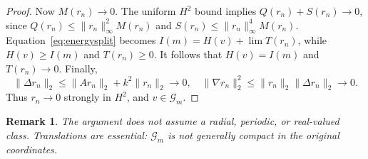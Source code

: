 \documentclass[11pt]{article}
\newtheorem{remark}[theorem]{Remark}
\newcommand{\nm}[2]{\lVert #1\rVert_{#2}}
\newcommand{\GG}{\mathcal G}
\begin{document}
\begin{proof}
Now \(M(r_n)\to0\). The uniform \(H^2\) bound implies
\(Q(r_n)+S(r_n)\to0\), since
\(Q(r_n)\le\nm{r_n}{\infty}^2M(r_n)\) and
\(S(r_n)\le\nm{r_n}{\infty}^4M(r_n)\).
Equation~\eqref{eq:energysplit} becomes
\(I(m)=H(v)+\lim T(r_n)\), while \(H(v)\ge I(m)\) and
\(T(r_n)\ge0\). It follows that \(H(v)=I(m)\) and \(T(r_n)\to0\).
Finally,
\[
\nm{\Delta r_n}{2}\le \nm{Ar_n}{2}+k^2\nm{r_n}{2}\to0,
\quad
\nm{\nabla r_n}{2}^2\le\nm{r_n}{2}\nm{\Delta r_n}{2}\to0.
\]
Thus \(r_n\to0\) strongly in \(H^2\), and \(v\in\GG_m\).
\end{proof}

\begin{remark}
The argument does not assume a radial, periodic, or real-valued class.
Translations are essential: \(\GG_m\) is not generally compact in the
original coordinates.
\end{remark}
\end{document}
